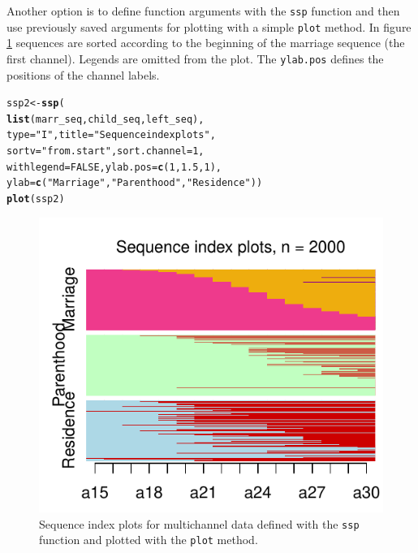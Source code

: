 \documentclass[12pt]{article}\usepackage[]{graphicx}\usepackage[]{color}
\makeatletter
\def\maxwidth{ %
  \ifdim\Gin@nat@width>\linewidth
    \linewidth
  \else
    \Gin@nat@width
  \fi
}
\newcommand{\hlnum}[1]{\textcolor[rgb]{0.686,0.059,0.569}{#1}}%
\newcommand{\hlstr}[1]{\textcolor[rgb]{0.192,0.494,0.8}{#1}}%
\newcommand{\hlstd}[1]{\textcolor[rgb]{0.345,0.345,0.345}{#1}}%
\newcommand{\hlkwb}[1]{\textcolor[rgb]{0.69,0.353,0.396}{#1}}%
\newcommand{\hlkwc}[1]{\textcolor[rgb]{0.333,0.667,0.333}{#1}}%
\newcommand{\hlkwd}[1]{\textcolor[rgb]{0.737,0.353,0.396}{\textbf{#1}}}%
\newenvironment{kframe}{%
 \def\at@end@of@kframe{}%
 \ifinner\ifhmode%
  \def\at@end@of@kframe{\end{minipage}}%
  \begin{minipage}{\columnwidth}%
 \fi\fi%
 \def\FrameCommand##1{\hskip\@totalleftmargin \hskip-\fboxsep
 \colorbox{shadecolor}{##1}\hskip-\fboxsep
     \hskip-\linewidth \hskip-\@totalleftmargin \hskip\columnwidth}%
 \MakeFramed {\advance\hsize-\width
   \@totalleftmargin\z@ \linewidth\hsize
   \@setminipage}}%
 {\par\unskip\endMakeFramed%
 \at@end@of@kframe}
\newenvironment{knitrout}{}{} %
\makeatother
\begin{document}
Another option is to define function arguments with the \texttt{ssp} function and then use previously saved arguments for plotting with a simple \texttt{plot} method. In figure \ref{fig:plotI} sequences are sorted according to the beginning of the marriage sequence (the first channel). Legends are omitted from the plot. The \texttt{ylab.pos} defines the positions of the channel labels.

\begin{knitrout}
\color{fgcolor}\begin{kframe}
\begin{alltt}
\hlstd{ssp2} \hlkwb{<-} \hlkwd{ssp}\hlstd{(}
  \hlkwd{list}\hlstd{(marr_seq, child_seq, left_seq),}
  \hlkwc{type} \hlstd{=} \hlstr{"I"}\hlstd{,}\hlkwc{title} \hlstd{=} \hlstr{"Sequence index plots"}\hlstd{,}
  \hlkwc{sortv} \hlstd{=} \hlstr{"from.start"}\hlstd{,} \hlkwc{sort.channel} \hlstd{=} \hlnum{1}\hlstd{,}
  \hlkwc{withlegend} \hlstd{=} \hlnum{FALSE}\hlstd{,} \hlkwc{ylab.pos} \hlstd{=} \hlkwd{c}\hlstd{(}\hlnum{1}\hlstd{,} \hlnum{1.5}\hlstd{,} \hlnum{1}\hlstd{),}
  \hlkwc{ylab} \hlstd{=} \hlkwd{c}\hlstd{(}\hlstr{"Marriage"}\hlstd{,} \hlstr{"Parenthood"}\hlstd{,} \hlstr{"Residence"}\hlstd{))}
\hlkwd{plot}\hlstd{(ssp2)}
\end{alltt}
\end{kframe}\begin{figure}

{\centering \includegraphics[width=\maxwidth]{figure/plotI-1} 

}

\caption[Sequence index plots for multichannel data defined with the \texttt{ssp} function and plotted with the \texttt{plot} method]{Sequence index plots for multichannel data defined with the \texttt{ssp} function and plotted with the \texttt{plot} method.}\label{fig:plotI}
\end{figure}


\end{knitrout}
\end{document}

